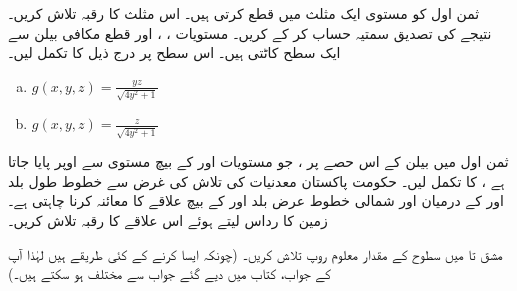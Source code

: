 \quad
ثمن اول کو مستوی  ایک مثلث  میں قطع کرتی ہیں۔ اس مثلث کا رقبہ تلاش کریں۔ نتیجے کی تصدیق سمتیہ حساب کر کے کریں۔
\quad
مستویات ، ، اور  قطع مکافی بیلن   سے ایک سطح  کاٹتی ہیں۔ اس سطح پر  درج ذیل کا تکمل لیں۔
\begin{enumerate}[a.]
\item
\(g(x,y,z)=\frac{yz}{\sqrt{4y^2+1}}\)
\item
\(g(x,y,z)=\frac{z}{\sqrt{4y^2+1}}\)
\end{enumerate}
\quad
ثمن اول میں بیلن  کے اس حصے پر ، جو مستویات  اور  کے بیچ   مستوی  سے اوپر پایا جاتا ہے  ،  کا تکمل لیں۔
حکومت پاکستان معدنیات کی تلاش کی غرض  سے خطوط طول  بلد   اور  کے  درمیان اور   شمالی خطوط  عرض بلد  اور   کے بیچ   علاقے کا معائنہ کرنا چاہتی ہے۔  زمین کا رداس  لیتے ہوئے اس علاقے کا رقبہ تلاش کریں۔

مشق   تا   میں سطوح کے مقدار معلوم روپ تلاش کریں۔ (چونکہ ایسا کرنے کے کئی طریقے ہیں لہٰذا آپ کے جواب، کتاب میں دیے گئے  جواب سے مختلف ہو سکتے ہیں۔)

